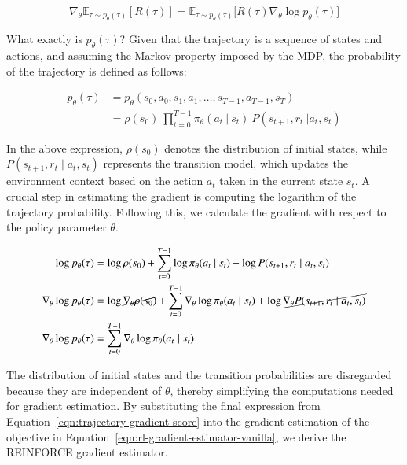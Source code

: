 \begin{equation}\label{eqn:rl-gradient-estimator-vanilla}
    \nabla_{\theta} \mathbb{E}_{\tau\sim p_{\theta}(\tau)}[R(\tau)] = \mathbb{E}_{\tau\sim p_{\theta}(\tau)}\big[R(\tau)\nabla_{\theta}\log p_{\theta}(\tau)\big]
\end{equation}    


\noindent What exactly is $p_{\theta}(\tau)$? Given that the trajectory is a sequence of states and actions, and assuming the Markov property imposed by the MDP, the probability of the trajectory is defined as follows:

\begin{equation}\label{eqn:trajectory-probability-expanded}
    \begin{split}
        p_{\theta}(\tau) &= p_\theta(s_{0}, a_{0}, s_{1}, a_{1}, \dots, s_{T-1}, a_{T-1}, s_{T}) \\
        &= \rho(s_0)~\prod_{t=0}^{T-1} \pi_{\theta}(a_{t}~|~s_{t})~P(s_{t+1}, r_{t}~|a_{t}, s_{t})
    \end{split}
\end{equation}

\noindent In the above expression, $\rho(s_{0})$ denotes the distribution of initial states, while $P(s_{t+1}, r_{t}\mid a_{t}, s_{t})$ represents the transition model, which updates the environment context based on the action $a_{t}$ taken in the current state $s_{t}$. A crucial step in estimating the gradient is computing the logarithm of the trajectory probability. Following this, we calculate the gradient with respect to the policy parameter $\theta$. 

\begin{equation}\label{eqn:trajectory-gradient-score}
    \begin{split}
        \log p_{\theta}(\tau) &= \log \rho(s_0) + \sum_{t=0}^{T-1}\log \pi_{\theta}(a_{t}~|~s_{t}) + \log P(s_{t+1}, r_{t}\mid a_{t}, s_{t}) \\
        \nabla_{\theta}\log p_{\theta}(\tau) &= \log \cancel{\nabla_{\theta}\rho(s_0)} + \sum_{t=0}^{T-1}\nabla_{\theta}\log \pi_{\theta}(a_{t}\mid s_{t}) + \log\cancel{\nabla_{\theta} P(s_{t+1}, r_{t}\mid a_{t}, s_{t})} \\
        \nabla_{\theta} \log p_{\theta}(\tau) &=  \sum_{t=0}^{T-1}\nabla_{\theta}\log \pi_{\theta}(a_{t}\mid s_{t}) 
    \end{split}
\end{equation}

\noindent The distribution of initial states and the transition
probabilities are disregarded because they are independent of $\theta$, thereby simplifying the computations needed for gradient estimation. By substituting the final expression from Equation~\ref{eqn:trajectory-gradient-score} into the gradient estimation of the objective in Equation~\ref {eqn:rl-gradient-estimator-vanilla}, we derive the REINFORCE gradient estimator.

